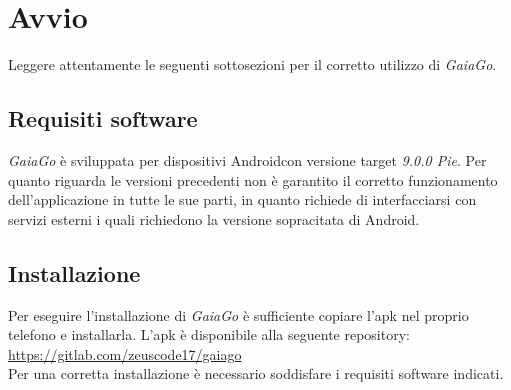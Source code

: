 \section{Avvio}
Leggere attentamente le seguenti sottosezioni per il corretto utilizzo di \textit{GaiaGo}.
\subsection{Requisiti software}
\textit{GaiaGo} è sviluppata per dispositivi Android\glosp con versione target \textit{9.0.0 Pie}. Per quanto riguarda le versioni precedenti non è garantito il corretto funzionamento dell'applicazione in tutte le sue parti, in quanto richiede di interfacciarsi con servizi esterni i quali richiedono la versione sopracitata di Android. 

\subsection{Installazione}
 Per eseguire l'installazione di \textit{GaiaGo} è sufficiente copiare l'apk nel proprio telefono e installarla.
 L'apk è disponibile alla seguente repository: 
 \url{https://gitlab.com/zeuscode17/gaiago} \\
 Per una corretta installazione è necessario soddisfare i requisiti software indicati.